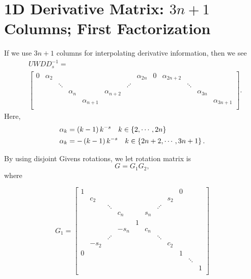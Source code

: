 \section{1D \CV{} Derivative Matrix: $3n+1$ Columns; First Factorization}
\label{sec:CV_D_1D_3n_F2}

If we use $3n+1$ columns for interpolating derivative information,
then we see
%
\begin{align}
    &UWDD_{s}^{-1} = \nonumber\\
    &\begin{bmatrix}
        0 & \alpha_{2} & & & & & & \alpha_{2n} & 0 & \alpha_{2n+2} & \\
          & & \ddots & & & & \iddots & & & & \ddots & \\
          & & & \alpha_{n} & & \alpha_{n+2} & & & & & & \alpha_{3n} \\
          & & & & \alpha_{n+1} & & & & & & & & \alpha_{3n+1} \\
        \end{bmatrix}.
\end{align}
%
Here,
%
\begin{align}
    \alpha_{k} &= \left( k-1 \right)k^{-s} \quad k\in\left\{ 2,\cdots,2n \right\} \nonumber\\
    \alpha_{k} &= -\left( k-1 \right)k^{-s} \quad k\in\left\{ 2n+2,\cdots,3n+1 \right\}.
\end{align}

By using disjoint Givens rotations, we let rotation matrix is
%
\begin{equation}
    G = G_{1}G_{2},
\end{equation}
%
where

\begin{equation}
    G_{1} = \begin{bmatrix}
        1 & & & & & & & & 0 \\
        & c_{2} & & & & & & s_{2} & \\
        & & \ddots & & & & \iddots & & \\
        & & & c_{n} & & s_{n} & & & & \\
        & & & & 1 & & & & \\
        & & & -s_{n} & & c_{n} & & & & \\
        & & \iddots & & & & \ddots & & \\
        & -s_{2} & & & & & & c_{2} & \\
        0 & & & & & & & & 1 \\
        & & & & & & & & & \ddots \\ 
        & & & & & & & & & & 1 \\ 
    \end{bmatrix}
\end{equation}

